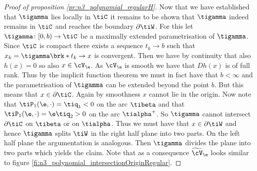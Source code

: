 \begin{proof}[Proof of proposition \ref{pr:n3_polynomial_regularH}]
  Now that we have established that $\tigamma$ lies locally in $\tiC$ it remains to be shown that
  $\tigamma$ indeed remains in $\tiC$ and reaches the boundary $\partial \tiW$.
  For this let $\tigamma\colon [0,b)\to \tiC$ be a maximally extended parametrisation of $\tigamma$.
  Since $\tiC$ is compact there exists a sequence $t_k\to b$ such that $x_k=\tigamma\brk*{t_k}\to x$
  is convergent. Then we have by continuity that also $h(x)=0$ so also $x\in\cV_\e$.
  As $\cV_\e$ is smooth we have that $Dh(x)$ is of full rank. Thus by the implicit function theorem 
  we must in fact have that $b<\infty$ and the parametrisation of $\tigamma$ can be extended beyond
  the point $b$. But this means that $x\in\partial \tiC$.
  Again by smoothness $x$ cannot lie in the origin. 
  Now note that
  $\tiP_1(\e,\cdot)=\tiq_1<0$ on the arc $\tibeta$ and that
  $\tiP_1(\e,\cdot)=\e\tiq_2>0$ on the arc $\tialpha^+$.
  So $\tigamma$ cannot intersect $\partial \tiC$ on $\tibeta$ or on $\tialpha$.
  Thus we must have that $x\in\partial \tiW$ and hence $\tigamma$ splits $\tiW$ in the right half plane into two parts.
  On the left half plane the argumentation is analogous.
  Then $\tigamma$ divides the plane into two
  parts which yields the claim.
  Note that as a consequence $\widetilde{\cV}_\e$
  looks similar to figure \ref{fi:n3_polynomial_intersectionOriginRegular}.
\end{proof}

